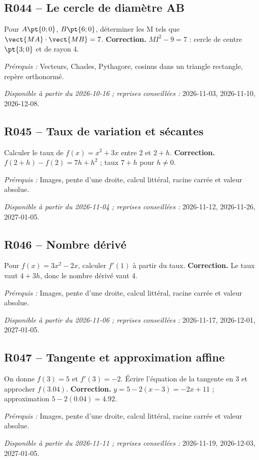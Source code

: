 \subsection*{R044 -- Le cercle de diamètre AB}\label{R044}
Pour $A\pt{0;0}$, $B\pt{6;0}$, déterminer les M tels que $\vect{MA}\cdot\vect{MB}=7$.
\ifmxteacher\textbf{Correction.} $MI^2-9=7$ : cercle de centre $\pt{3;0}$ et de rayon 4.\par\textit{Prérequis :} Vecteurs, Chasles, Pythagore, cosinus dans un triangle rectangle, repère orthonormé.\par\textit{Disponible à partir du 2026-10-16 ; reprises conseillées :} 2026-11-03, 2026-11-10, 2026-12-08.\fi
{}\subsection*{R045 -- Taux de variation et sécantes}\label{R045}
Calculer le taux de $f(x)=x^2+3x$ entre 2 et $2+h$.
\ifmxteacher\textbf{Correction.} $f(2+h)-f(2)=7h+h^2$ ; taux $7+h$ pour $h\ne0$.\par\textit{Prérequis :} Images, pente d’une droite, calcul littéral, racine carrée et valeur absolue.\par\textit{Disponible à partir du 2026-11-04 ; reprises conseillées :} 2026-11-12, 2026-11-26, 2027-01-05.\fi
{}\subsection*{R046 -- Nombre dérivé}\label{R046}
Pour $f(x)=3x^2-2x$, calculer $f\prime(1)$ à partir du taux.
\ifmxteacher\textbf{Correction.} Le taux vaut $4+3h$, donc le nombre dérivé vaut 4.\par\textit{Prérequis :} Images, pente d’une droite, calcul littéral, racine carrée et valeur absolue.\par\textit{Disponible à partir du 2026-11-06 ; reprises conseillées :} 2026-11-17, 2026-12-01, 2027-01-05.\fi
{}\subsection*{R047 -- Tangente et approximation affine}\label{R047}
On donne $f(3)=5$ et $f\prime(3)=-2$. Écrire l’équation de la tangente en $3$ et approcher $f(\num{3,04})$.
\ifmxteacher\textbf{Correction.} $y=5-2(x-3)=-2x+11$ ; approximation $5-2(\num{0,04})=\num{4,92}$.\par\textit{Prérequis :} Images, pente d’une droite, calcul littéral, racine carrée et valeur absolue.\par\textit{Disponible à partir du 2026-11-11 ; reprises conseillées :} 2026-11-19, 2026-12-03, 2027-01-05.\fi
